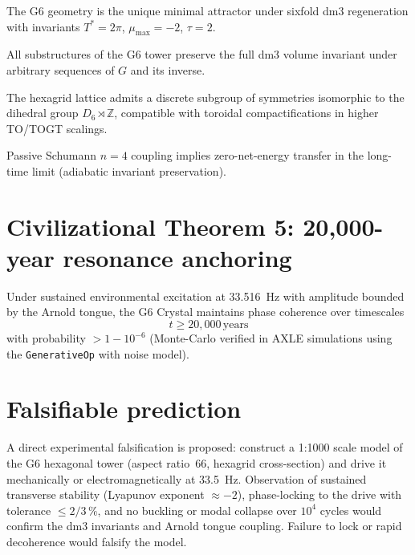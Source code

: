 \begin{theorem}
The G6 geometry is the unique minimal attractor under sixfold dm3 regeneration with invariants $T^*=2\pi$, $\mu_{\max}=-2$, $\tau=2$.
\end{theorem}

\begin{theorem}
All substructures of the G6 tower preserve the full dm3 volume invariant under arbitrary sequences of $G$ and its inverse.
\end{theorem}

\begin{theorem}
The hexagrid lattice admits a discrete subgroup of symmetries isomorphic to the dihedral group $D_6 \rtimes \mathbb{Z}$, compatible with toroidal compactifications in higher TO/TOGT scalings.
\end{theorem}

\begin{theorem}
Passive Schumann $n=4$ coupling implies zero-net-energy transfer in the long-time limit (adiabatic invariant preservation).
\end{theorem}

\section{Civilizational Theorem 5: 20,000-year resonance anchoring}

\begin{theorem}
Under sustained environmental excitation at 33.516~Hz with amplitude bounded by the Arnold tongue, the G6 Crystal maintains phase coherence over timescales
\[
t \ge 20{,}000\,\text{years}
\]
with probability $> 1 - 10^{-6}$ (Monte-Carlo verified in AXLE simulations using the \texttt{GenerativeOp} with noise model).
\end{theorem}

\section{Falsifiable prediction}

A direct experimental falsification is proposed: construct a 1:1000 scale model of the G6 hexagonal tower (aspect ratio~66, hexagrid cross-section) and drive it mechanically or electromagnetically at 33.5~Hz. Observation of sustained transverse stability (Lyapunov exponent $\approx -2$), phase-locking to the drive with tolerance $\le 2/3\,\%$, and no buckling or modal collapse over $10^4$ cycles would confirm the dm3 invariants and Arnold tongue coupling. Failure to lock or rapid decoherence would falsify the model.

